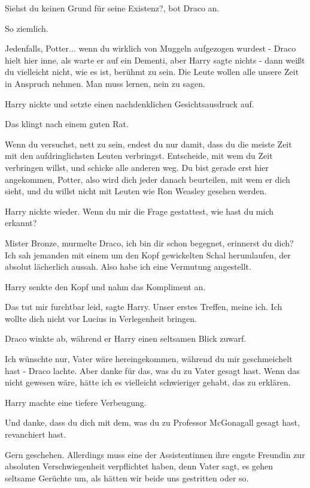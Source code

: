 \glqq{}Siehst du keinen Grund für seine Existenz?\grqq{}, bot Draco an.

\glqq{}So ziemlich.\grqq{}

\glqq{}Jedenfalls, Potter... wenn du wirklich von Muggeln aufgezogen wurdest
-\grqq{} Draco hielt hier inne, als warte er auf ein Dementi, aber Harry sagte
nichts \glqq{}- dann weißt du vielleicht nicht, wie es ist, berühmt zu sein. Die
Leute wollen alle unsere Zeit in Anspruch nehmen. Man muss lernen, nein zu
sagen.\grqq{}

Harry nickte und setzte einen nachdenklichen Gesichtsausdruck auf.

\glqq{}Das klingt nach einem guten Rat.\grqq{}

\glqq{}Wenn du versuchst, nett zu sein, endest du nur damit, dass du die meiste
Zeit mit den aufdringlichsten Leuten verbringst. Entscheide, mit wem du Zeit
verbringen willst, und schicke alle anderen weg. Du bist gerade erst hier
angekommen, Potter, also wird dich jeder danach beurteilen, mit wem er dich
sieht, und du willst nicht mit Leuten wie Ron Weasley gesehen werden.\grqq{}

Harry nickte wieder. \glqq{}Wenn du mir die Frage gestattest, wie hast du mich
erkannt?\grqq{}

\glqq{}Mister Bronze\grqq{}, murmelte Draco, \glqq{}ich bin dir schon begegnet,
erinnerst du dich? Ich sah jemanden mit einem um den Kopf gewickelten Schal
herumlaufen, der absolut lächerlich aussah. Also habe ich eine Vermutung
angestellt.\grqq{}

Harry senkte den Kopf und nahm das Kompliment an.

\glqq{}Das tut mir furchtbar leid\grqq{}, sagte Harry. \glqq{}Unser erstes
Treffen, meine ich. Ich wollte dich nicht vor Lucius in Verlegenheit
bringen.\grqq{}

Draco winkte ab, während er Harry einen seltsamen Blick zuwarf.

\glqq{}Ich wünschte nur, Vater wäre hereingekommen, während du mir geschmeichelt
hast -\grqq{} Draco lachte. \glqq{}Aber danke für das, was du zu Vater gesagt
hast. Wenn das nicht gewesen wäre, hätte ich es vielleicht schwieriger gehabt,
das zu erklären.\grqq{}

Harry machte eine tiefere Verbeugung.

\glqq{}Und danke, dass du dich mit dem, was du zu Professor McGonagall gesagt
hast, revanchiert hast.\grqq{}

\glqq{}Gern geschehen. Allerdings muss eine der Assistentinnen ihre engste
Freundin zur absoluten Verschwiegenheit verpflichtet haben, denn Vater sagt, es
gehen seltsame Gerüchte um, als hätten wir beide uns gestritten oder so.\grqq{}

